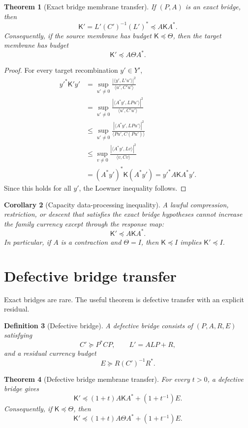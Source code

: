 \documentclass[11pt]{article}
\newtheorem{theorem}{Theorem}[section]
\newtheorem{definition}[theorem]{Definition}
\newtheorem{corollary}[theorem]{Corollary}
\newcommand{\K}{\mathsf K}
\newcommand{\pre}{\preceq}
\newcommand{\suc}{\succeq}
\begin{document}
\begin{theorem}[Exact bridge membrane transfer]
If \((P,A)\) is an exact bridge, then
\[
\boxed{\K'=L'(C')^{-1}(L')^*\pre A\K A^*.}
\]
Consequently, if the source membrane has budget \(\K\pre\Theta\), then the target membrane has budget
\[
\boxed{\K'\pre A\Theta A^*.}
\]
\end{theorem}

\begin{proof}
For every target recombination \(y'\in Y'\),
\begin{align*}
y'^*\K' y'
&=\sup_{u'\ne0}\frac{|\langle y',L'u'\rangle|^2}{\langle u',C'u'\rangle}\\
&=\sup_{u'\ne0}\frac{|\langle A^*y',LPu'\rangle|^2}{\langle u',C'u'\rangle}\\
&\le\sup_{u'\ne0}\frac{|\langle A^*y',LPu'\rangle|^2}{\langle Pu',C(Pu')\rangle}\\
&\le\sup_{v\ne0}\frac{|\langle A^*y',Lv\rangle|^2}{\langle v,Cv\rangle}\\
&=(A^*y')^*\K(A^*y')=y'^*A\K A^*y'.
\end{align*}
Since this holds for all \(y'\), the Loewner inequality follows.
\end{proof}

\begin{corollary}[Capacity data-processing inequality]
A lawful compression, restriction, or descent that satisfies the exact bridge hypotheses cannot increase the family currency except through the response map:
\[
\K'\pre A\K A^*.
\]
In particular, if \(A\) is a contraction and \(\Theta=I\), then \(\K\pre I\) implies \(\K'\pre I\).
\end{corollary}

\section{Defective bridge transfer}
Exact bridges are rare. The useful theorem is defective transfer with an explicit residual.

\begin{definition}[Defective bridge]
A defective bridge consists of \((P,A,R,E)\) satisfying
\[
C'\suc P^*CP,
\qquad
L'=ALP+R,
\]
and a residual currency budget
\[
E\suc R(C')^{-1}R^*.
\]
\end{definition}

\begin{theorem}[Defective bridge membrane transfer]
For every \(t>0\), a defective bridge gives
\[
\boxed{\K'\pre (1+t)A\K A^*+(1+t^{-1})E.}
\]
Consequently, if \(\K\pre\Theta\), then
\[
\boxed{\K'\pre (1+t)A\Theta A^*+(1+t^{-1})E.}
\]
\end{theorem}
\end{document}

